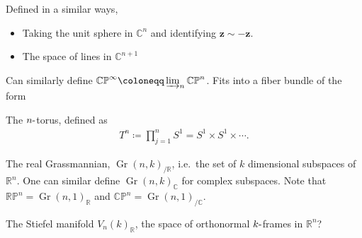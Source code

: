 \begin{example}

Defined in a similar ways,

\begin{itemize}
\tightlist
\item
  Taking the unit sphere in \({\mathbb{C}}^n\) and identifying
  \(\mathbf{z} \sim -\mathbf{z}\).
\item
  The space of lines in \({\mathbb{C}}^{n+1}\)
\end{itemize}

Can similarly define
\({\mathbb{CP}}^ \infty \coloneqq\varinjlim_n {\mathbb{CP}}^n\). Fits
into a fiber bundle of the form

\begin{center}
\end{center}

\end{example}

\begin{example}[Torii]

The \(n{\hbox{-}}\)torus, defined as
\begin{align*}
T^n \coloneqq\prod_{j=1}^n S^1 = S^1 \times S^1 \times \cdots
.\end{align*}

\end{example}

\begin{example}[Grassmannians]

The real Grassmannian, \({\operatorname{Gr}}(n, k)_{/{\mathbb{R}}}\),
i.e.~the set of \(k\) dimensional subspaces of \({\mathbb{R}}^n\). One
can similar define \({\operatorname{Gr}}(n, k)_{{\mathbb{C}}}\) for
complex subspaces. Note that
\({\mathbb{RP}}^n = {\operatorname{Gr}}(n, 1)_{{\mathbb{R}}}\) and
\({\mathbb{CP}}^n = {\operatorname{Gr}}(n, 1)_{/{\mathbb{C}}}\).

\end{example}

\begin{example}

The Stiefel manifold \(V_{n}(k)_{{\mathbb{R}}}\), the space of
orthonormal \(k{\hbox{-}}\)frames in \({\mathbb{R}}^n\)?

\end{example}

